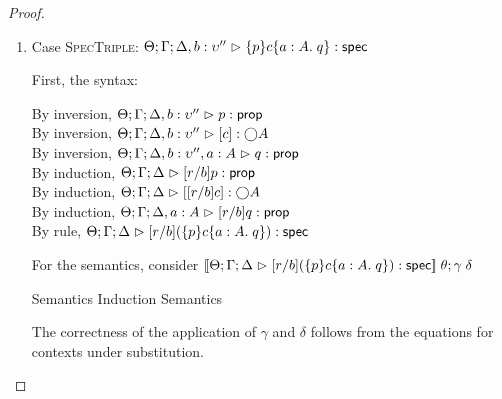 \begin{proof}
\begin{enumerate}
\item Case \textsc{SpecTriple}: $\judgeS[\Theta; \Gamma; \Delta, b:\upsilon'']{\spec{p}{c}{a:A}{q}}$
  
  First, the syntax:
  \begin{tabbedproof}
    \oo By inversion, $\judgeA[\Theta; \Gamma; \Delta, b:\upsilon'']{p}{\assert}$ \\
    \oo By inversion, $\judgeA[\Theta; \Gamma; \Delta, b:\upsilon'']{\comp{c}}{\monad{A}}$ \\
    \oo By inversion, $\judgeA[\Theta; \Gamma; \Delta, b:\upsilon'', a:A]{q}{\assert}$ \\
    \oo By induction, $\judgeA[\Theta; \Gamma; \Delta]{[r/b]p}{\assert}$ \\
    \oo By induction, $\judgeA[\Theta; \Gamma; \Delta]{\comp{[r/b]c}}{\monad{A}}$ \\
    \oo By induction, $\judgeA[\Theta; \Gamma; \Delta, a:A]{[r/b]q}{\assert}$ \\
    \oo By rule, $\judgeS[\Theta; \Gamma; \Delta]{[r/b](\spec{p}{c}{a:A}{q})}$
  \end{tabbedproof}

  For the semantics, consider $\interp{\judgeS[\Theta; \Gamma; \Delta]{[r/b](\spec{p}{c}{a:A}{q})}}\;\theta;\gamma\;\delta$
  \begin{eqnproof}
          {Semantics}
          {Induction}
          {Semantics}
  \end{eqnproof}
  The correctness of the application of $\gamma$ and $\delta$ follows from the equations for
  contexts under substitution. 


\end{enumerate}
\end{proof}
